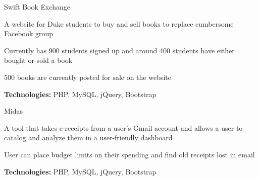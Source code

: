 
\begin{cventries}

  \cventry
    {} %
    {Swift Book Exchange} %
    {} %
    {} %
    {
      \begin{cvitems} %
      	\item {A website for Duke students to buy and sell books to replace cumbersome Facebook group}
		\item {Currently has 900 students signed up and around 400 students have either bought or sold a book}
		\item {500 books are currently posted for sale on the website}
		{\setlength \itemindent{-2ex} \itemsep2pt \item[] \textbf{Technologies:} PHP, MySQL, jQuery, Bootstrap}
      \end{cvitems}
    }
    
  \cventry
    {} %
    {Midas} %
    {} %
    {} %
    {
      \begin{cvitems} %
		\item {A tool that takes e-receipts from a user’s Gmail account and allows a user to catalog and
analyze them in a user-friendly dashboard}
        \item {User can place budget limits on their spending and find old receipts lost in email}
        {\setlength \itemindent{-2ex} \itemsep2pt \item[] \textbf{Technologies:} PHP, MySQL, jQuery, Bootstrap}
      \end{cvitems}
    }
\end{cventries}